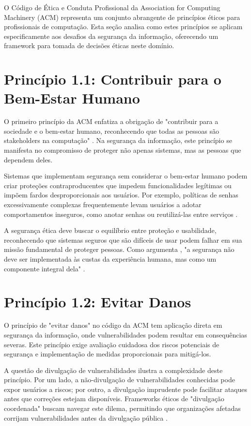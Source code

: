 O Código de Ética e Conduta Profissional da Association for Computing Machinery (ACM) representa um conjunto abrangente de princípios éticos para profissionais de computação. Esta seção analisa como estes princípios se aplicam especificamente aos desafios da segurança da informação, oferecendo um framework para tomada de decisões éticas neste domínio.

\section{Princípio 1.1: Contribuir para o Bem-Estar Humano}

O primeiro princípio da ACM enfatiza a obrigação de "contribuir para a sociedade e o bem-estar humano, reconhecendo que todas as pessoas são stakeholders na computação" \cite{acm2018}. Na segurança da informação, este princípio se manifesta no compromisso de proteger não apenas sistemas, mas as pessoas que dependem deles.

Sistemas que implementam segurança sem considerar o bem-estar humano podem criar proteções contraproducentes que impedem funcionalidades legítimas ou impõem fardos desproporcionais aos usuários. Por exemplo, políticas de senhas excessivamente complexas frequentemente levam usuários a adotar comportamentos inseguros, como anotar senhas ou reutilizá-las entre serviços \cite{adams1999users}.

A segurança ética deve buscar o equilíbrio entre proteção e usabilidade, reconhecendo que sistemas seguros que são difíceis de usar podem falhar em sua missão fundamental de proteger pessoas. Como argumenta \citeauthor{cranor2005security}, "a segurança não deve ser implementada às custas da experiência humana, mas como um componente integral dela" \cite{cranor2005security}.

\section{Princípio 1.2: Evitar Danos}

O princípio de "evitar danos" no código da ACM tem aplicação direta em segurança da informação, onde vulnerabilidades podem resultar em consequências severas. Este princípio exige avaliação cuidadosa dos riscos potenciais de segurança e implementação de medidas proporcionais para mitigá-los.

A questão de divulgação de vulnerabilidades ilustra a complexidade deste princípio. Por um lado, a não-divulgação de vulnerabilidades conhecidas pode expor usuários a riscos; por outro, a divulgação imprudente pode facilitar ataques antes que correções estejam disponíveis. Frameworks éticos de "divulgação coordenada" buscam navegar este dilema, permitindo que organizações afetadas corrijam vulnerabilidades antes da divulgação pública \cite{householder2020coordinated}.

